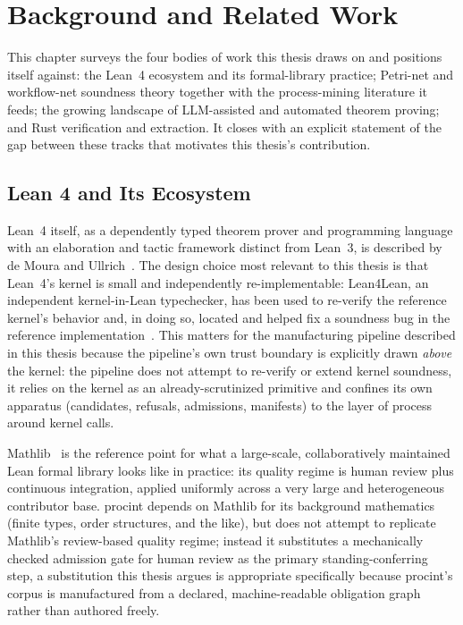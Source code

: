 \chapter{Background and Related Work}
\label{ch:background}

This chapter surveys the four bodies of work this thesis draws on and
positions itself against: the Lean~4 ecosystem and its formal-library
practice; Petri-net and workflow-net soundness theory together with the
process-mining literature it feeds; the growing landscape of
LLM-assisted and automated theorem proving; and Rust verification and
extraction. It closes with an explicit statement of the gap between
these tracks that motivates this thesis's contribution.

\section{Lean 4 and Its Ecosystem}

Lean~4 itself, as a dependently typed theorem prover and programming
language with an elaboration and tactic framework distinct from Lean~3,
is described by de Moura and Ullrich~\cite{moura2021lean4}. The design
choice most relevant to this thesis is that Lean~4's kernel is small and
independently re-implementable: Lean4Lean, an independent kernel-in-Lean
typechecker, has been used to re-verify the reference kernel's behavior
and, in doing so, located and helped fix a soundness bug in the
reference implementation~\cite{lean4lean2024}. This matters for the
manufacturing pipeline described in this thesis because the pipeline's
own trust boundary is explicitly drawn \emph{above} the kernel: the
pipeline does not attempt to re-verify or extend kernel soundness, it
relies on the kernel as an already-scrutinized primitive and confines its
own apparatus (candidates, refusals, admissions, manifests) to the layer
of process around kernel calls.

Mathlib~\cite{mathlib2020} is the reference point for what a
large-scale, collaboratively maintained Lean formal library looks like in
practice: its quality regime is human review plus continuous
integration, applied uniformly across a very large and heterogeneous
contributor base. \textsf{procint} depends on Mathlib for its background
mathematics (finite types, order structures, and the like), but does not
attempt to replicate Mathlib's review-based quality regime; instead it
substitutes a mechanically checked admission gate for human review as the
primary standing-conferring step, a substitution this thesis argues is
appropriate specifically because \textsf{procint}'s corpus is
manufactured from a declared, machine-readable obligation graph rather
than authored freely.

